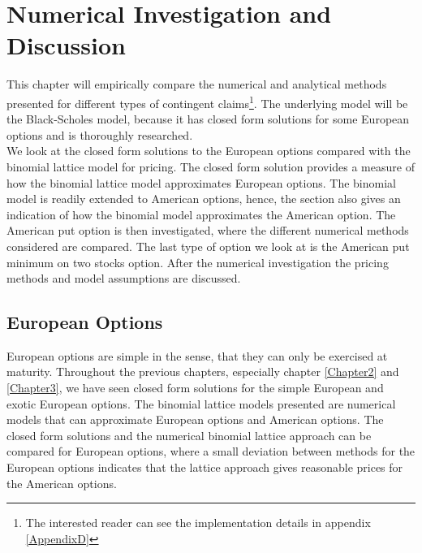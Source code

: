 
\chapter{Numerical Investigation and Discussion} %

\label{Chapter6} %

This chapter will empirically compare the numerical and analytical methods presented for different types of contingent claims\footnote{The interested reader can see the implementation details in appendix \ref{AppendixD}}. The underlying model will be the Black-Scholes model, because it has closed form solutions for some European options and is thoroughly researched.\\

We look at the closed form solutions to the European options compared with the binomial lattice model for pricing. The closed form solution provides a measure of how the binomial lattice model approximates European options. The binomial model is readily extended to American options, hence, the section also gives an indication of how the binomial model approximates the American option. The American put option is then investigated, where the different numerical methods considered are compared. The last type of option we look at is the American put minimum on two stocks option. After the numerical investigation the pricing methods and model assumptions are discussed.


\section{European Options}\label{EuroOption}
European options are simple in the sense, that they can only be exercised at maturity. Throughout the previous chapters, especially chapter \ref{Chapter2} and \ref{Chapter3}, we have seen closed form solutions for the simple European and exotic European options. The binomial lattice models presented are numerical models that can approximate European options and American options. The closed form solutions and the numerical binomial lattice approach can be compared for European options, where a small deviation between methods for the European options indicates that the lattice approach gives reasonable prices for the American options.\\

